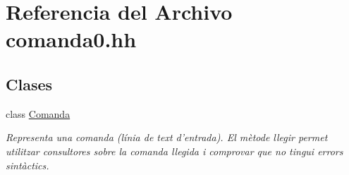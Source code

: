 \hypertarget{comanda0_8hh}{\section{Referencia del Archivo comanda0.\-hh}
\label{comanda0_8hh}
}
\subsection*{Clases}
\begin{DoxyCompactItemize}
\item 
class \hyperlink{class_comanda}{Comanda}
\begin{DoxyCompactList}\small\item\em Representa una comanda (línia de text d'entrada). El mètode llegir permet utilitzar consultores sobre la comanda llegida i comprovar que no tingui errors sintàctics. \end{DoxyCompactList}\end{DoxyCompactItemize}
